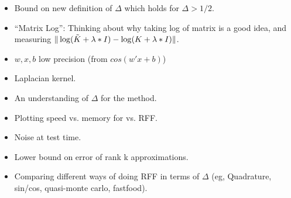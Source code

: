 \begin{itemize}
	\item Bound on new definition of $\Delta$ which holds for $\Delta > 1/2$.
	\item ``Matrix Log'': Thinking about why taking log of matrix is a good idea, and measuring $\|\log(\tilde{K} + \lambda * I) - \log(K + \lambda * I)\|$.
	\item $w,x,b$ low precision (from $cos(w'x + b)$)
	\item Laplacian kernel.
	\item An understanding of $\Delta$ for the \Nystrom method.
	\item Plotting speed vs. memory for \Nystrom vs. RFF.
	\item Noise at test time.
	\item Lower bound on error of rank k approximations.
	\item Comparing different ways of doing RFF in terms of $\Delta$ (eg, Quadrature, sin/cos, quasi-monte carlo, fastfood).
\end{itemize}